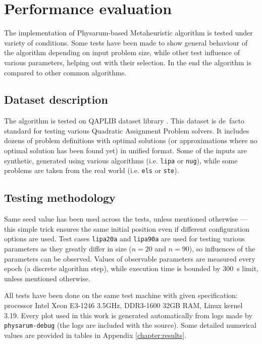 \section{Performance evaluation}
\label{section:project_evaluation}

The implementation of Physarum-based Metaheuristic algorithm is tested under variety of conditions. Some tests have been made to show general behaviour of the algorithm depending on input problem size, while other test influence of various parameters, helping out with their selection. In the end the algorithm is compared to other common algorithms.


\subsection{Dataset description}

The algorithm is tested on QAPLIB dataset library \cite{burkard1997qaplib}. This dataset is de~facto standard for testing various Quadratic Assignment Problem solvers. It includes dozens of problem definitions with optimal solutions (or approximations where no optimal solution has been found yet) in unified format. Some of the inputs are synthetic, generated using various algorithms (i.e. \texttt{lipa} or \texttt{nug}), while some problems are taken from the real world (i.e. \texttt{els} or \texttt{ste}).


\subsection{Testing methodology}

Same seed value has been used across the tests, unless mentioned otherwise --- this simple trick ensures the same initial position even if different configuration options are used. Test cases \texttt{lipa20a} and \texttt{lipa90a} are used for testing various parameters as they greatly differ in size ($n=20$ and $n=90$), so influences of the parameters can be observed. Values of observable parameters are measured every epoch (a discrete algorithm step), while execution time is bounded by 300~s limit, unless mentioned otherwise.

All tests have been done on the same test machine with given specification: processor Intel Xeon E3-1246 3.5GHz, DDR3-1600 32GB RAM, Linux kernel 3.19. Every plot used in this work is generated automatically from logs made by \texttt{physarum-debug} (the logs are included with the source). Some detailed numerical values are provided in tables in Appendix \ref{chapter:results}.


